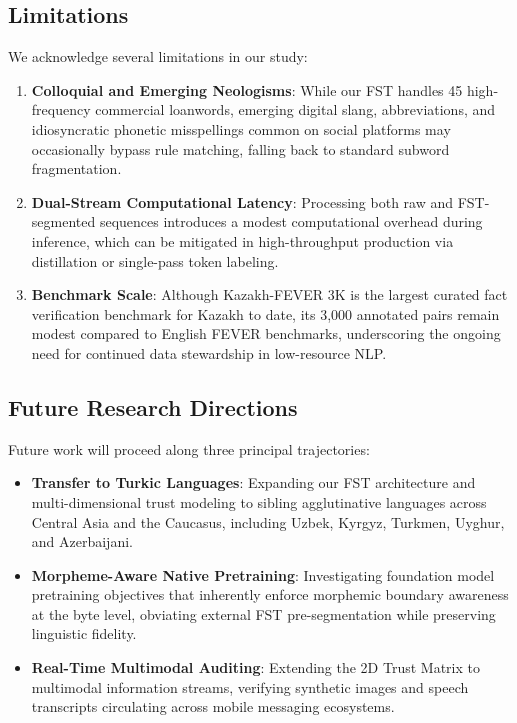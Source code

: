 \subsection{Limitations}
We acknowledge several limitations in our study:
\begin{enumerate}
    \item \textbf{Colloquial and Emerging Neologisms}: While our FST handles 45 high-frequency commercial loanwords, emerging digital slang, abbreviations, and idiosyncratic phonetic misspellings common on social platforms may occasionally bypass rule matching, falling back to standard subword fragmentation.
    \item \textbf{Dual-Stream Computational Latency}: Processing both raw and FST-segmented sequences introduces a modest computational overhead during inference, which can be mitigated in high-throughput production via distillation or single-pass token labeling.
    \item \textbf{Benchmark Scale}: Although Kazakh-FEVER 3K is the largest curated fact verification benchmark for Kazakh to date, its 3,000 annotated pairs remain modest compared to English FEVER benchmarks, underscoring the ongoing need for continued data stewardship in low-resource NLP.
\end{enumerate}

\subsection{Future Research Directions}
Future work will proceed along three principal trajectories:
\begin{itemize}
    \item \textbf{Transfer to Turkic Languages}: Expanding our FST architecture and multi-dimensional trust modeling to sibling agglutinative languages across Central Asia and the Caucasus, including Uzbek, Kyrgyz, Turkmen, Uyghur, and Azerbaijani.
    \item \textbf{Morpheme-Aware Native Pretraining}: Investigating foundation model pretraining objectives that inherently enforce morphemic boundary awareness at the byte level, obviating external FST pre-segmentation while preserving linguistic fidelity.
    \item \textbf{Real-Time Multimodal Auditing}: Extending the 2D Trust Matrix to multimodal information streams, verifying synthetic images and speech transcripts circulating across mobile messaging ecosystems.
\end{itemize}
